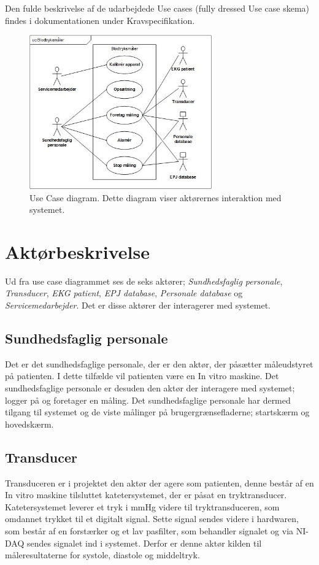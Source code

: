 Den fulde beskrivelse af de udarbejdede Use cases (fully dressed Use case skema) findes i dokumentationen under Kravspecifikation.
\begin{figure}[H]
\includegraphics[width =0.7\textwidth , center]{billeder/UseCaseDiagram}
\caption{Use Case diagram. Dette diagram viser aktørernes interaktion med systemet.}
\end{figure}
\section{Aktørbeskrivelse}
Ud fra use case diagrammet ses de seks aktører; \textit{Sundhedsfaglig personale}, \textit{Transducer}, \textit{EKG patient}, \textit{EPJ database}, \textit{Personale database} og \textit{Servicemedarbejder}. Det er disse aktører der interagerer med systemet.
\subsection{Sundhedsfaglig personale}
Det er det sundhedsfaglige personale, der er den aktør, der påsætter måleudstyret på patienten. I dette tilfælde vil patienten være en In vitro maskine. Det sundhedsfaglige personale er desuden den aktør der interagere med systemet; logger på og foretager en måling. Det sundhedsfaglige personale har dermed tilgang til systemet og de viste målinger på brugergrænsefladerne; startskærm og hovedskærm.
\subsection{Transducer}
Transduceren er i projektet den aktør der agere som patienten, denne består af en In vitro maskine tilsluttet katetersystemet, der er påsat en tryktransducer. Katetersystemet leverer et tryk i mmHg videre til tryktransduceren, som omdannet trykket til et digitalt signal. Sette signal sendes videre i hardwaren, som består af en forstærker og et lav pasfilter, som behandler signalet og via NI-DAQ sendes signalet ind i systemet. Derfor er denne aktør kilden til måleresultaterne for systole, diastole og middeltryk.
